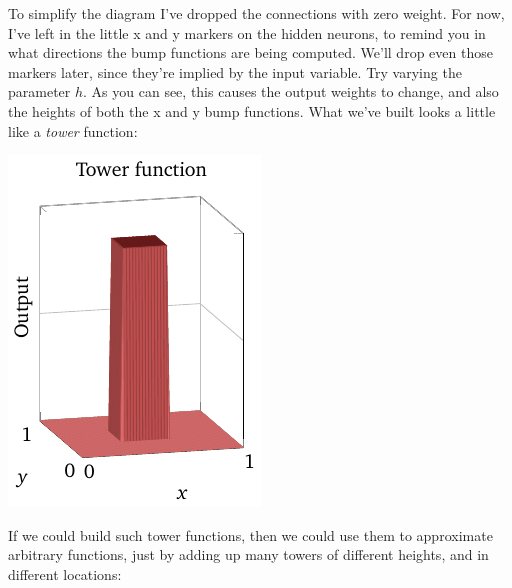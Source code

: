 \documentclass[a4paper,twoside,10pt]{book}
\begin{document}
To simplify the diagram I've dropped the connections with zero weight. For now, I've left in the little x and y markers on the hidden neurons, to remind you in what directions the bump functions are being computed. We'll drop even those markers later, since they're implied by the input variable.
%
Try varying the parameter $h$. As you can see, this causes the output weights to change, and also the heights of both the x and y bump functions.
%
What we've built looks a little like a \textit{tower} function:
\begin{center}
\includegraphics[width=0.32\linewidth]{./figures/ch4/3d/towerfunction}%
\end{center}
%
If we could build such tower functions, then we could use them to approximate arbitrary functions, just by adding up many towers of different heights, and in different locations:
\end{document}
